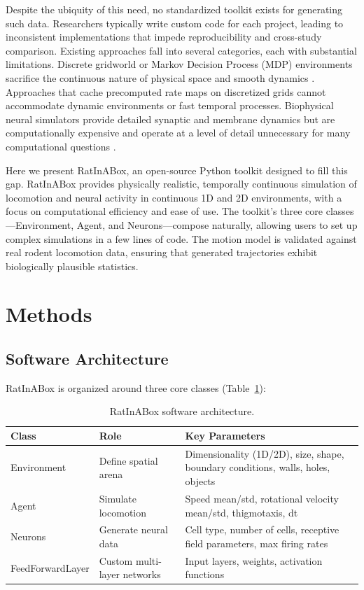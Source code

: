 \documentclass[12pt]{article}
\begin{document}
Despite the ubiquity of this need, no standardized toolkit exists for generating such data. Researchers typically write custom code for each project, leading to inconsistent implementations that impede reproducibility and cross-study comparison. Existing approaches fall into several categories, each with substantial limitations. Discrete gridworld or Markov Decision Process (MDP) environments sacrifice the continuous nature of physical space and smooth dynamics \citep{sutton2018reinforcement}. Approaches that cache precomputed rate maps on discretized grids cannot accommodate dynamic environments or fast temporal processes. Biophysical neural simulators provide detailed synaptic and membrane dynamics but are computationally expensive and operate at a level of detail unnecessary for many computational questions \citep{hines1997neuron}.

Here we present RatInABox, an open-source Python toolkit designed to fill this gap. RatInABox provides physically realistic, temporally continuous simulation of locomotion and neural activity in continuous 1D and 2D environments, with a focus on computational efficiency and ease of use. The toolkit's three core classes---Environment, Agent, and Neurons---compose naturally, allowing users to set up complex simulations in a few lines of code. The motion model is validated against real rodent locomotion data, ensuring that generated trajectories exhibit biologically plausible statistics.

\section{Methods}

\subsection{Software Architecture}

RatInABox is organized around three core classes (Table~\ref{tab:architecture}):

\begin{table}[htbp]
\centering
\caption{RatInABox software architecture.}
\label{tab:architecture}
\begin{tabular}{llp{7cm}}
\toprule
Class & Role & Key Parameters \\
\midrule
Environment & Define spatial arena & Dimensionality (1D/2D), size, shape, boundary conditions, walls, holes, objects \\
Agent & Simulate locomotion & Speed mean/std, rotational velocity mean/std, thigmotaxis, dt \\
Neurons & Generate neural data & Cell type, number of cells, receptive field parameters, max firing rates \\
FeedForwardLayer & Custom multi-layer networks & Input layers, weights, activation functions \\
\bottomrule
\end{tabular}
\end{table}
\end{document}
